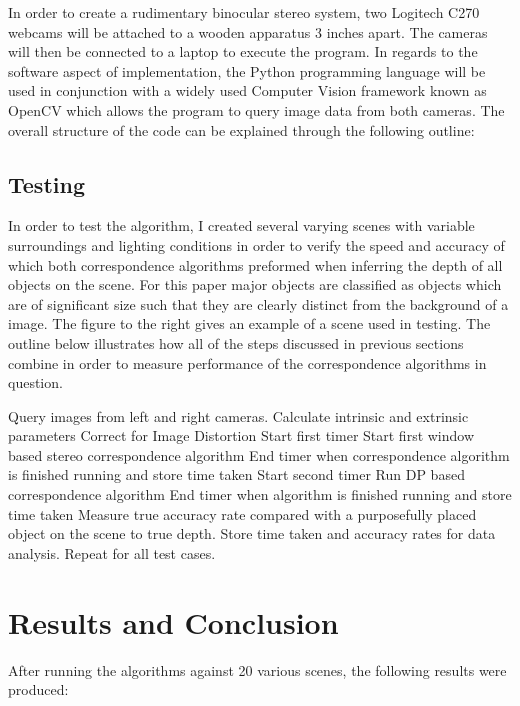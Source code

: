 \documentclass[11pt]{scrartcl}
\begin{document}
In order to create a rudimentary binocular stereo system, two Logitech C270 webcams will be attached to a wooden apparatus 3 inches apart. The cameras will then be connected to a laptop to execute the program. In regards to the software aspect of implementation, the Python programming language will be used in conjunction with a widely used Computer Vision framework known as OpenCV which allows the program to query image data from both cameras. The overall structure of the code can be explained through the following outline:



\subsection{Testing}
In order to test the algorithm, I created several varying scenes with variable surroundings 
and lighting conditions in order to verify the speed and accuracy of which both correspondence
algorithms preformed when inferring the depth of all objects on the scene. For this paper 
major objects are classified as objects which are of significant size such that they are clearly 
distinct from the background of a image. The figure to the right gives an example of a scene used 
in testing. The outline below illustrates how all of the steps discussed in previous sections 
combine in order to measure performance of the correspondence algorithms in question. 
\begin{outline}[enumerate]
   \1 Query images from left and right cameras.  
    \1 Calculate intrinsic and extrinsic parameters 
   \1 Correct for Image Distortion 
   \1 Start first timer 
   \1 Start first window based stereo correspondence algorithm 
   \1 End timer when correspondence algorithm is finished running and store time taken 
   \1 Start second timer
   \1 Run DP based correspondence algorithm 
   \1 End timer when algorithm is finished running and store time taken
   \1 Measure true accuracy rate compared with a purposefully placed object on the scene 
        to true depth. 
    \1 Store time taken and accuracy rates for data analysis. 
    \1 Repeat for all test cases. 
\end{outline}
\section{Results and Conclusion}

After running the algorithms against 20 various scenes, the following results were 
produced:
\\
\end{document}
